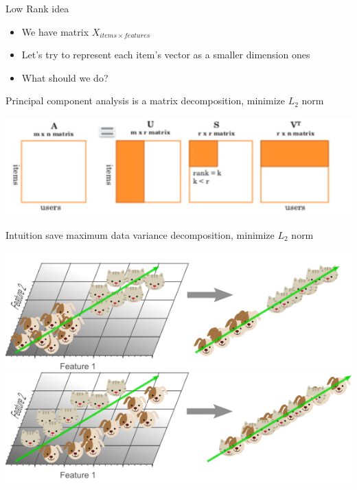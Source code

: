 \documentclass{beamer}
\begin{document}
\begin{frame}{Low Rank idea}
	\begin{itemize}
		\item We have matrix $X_{items \times features}$
		\item Let's try to represent each item's vector as a smaller dimension ones
		\item What should we do? 
	\end{itemize}
	
	Principal component analysis is a matrix decomposition,  minimize $L_2$ norm
	
	\begin{center}
		\includegraphics[scale=0.2]{img/svd}
	\end{center}
	
	Intuition save maximum data variance 
	 decomposition,  minimize $L_2$ norm
	 
	 \begin{center}
	 	\includegraphics[scale=0.3]{img/2} \includegraphics[scale=0.3]{img/1}
	 \end{center}
\end{frame}
\end{document}
